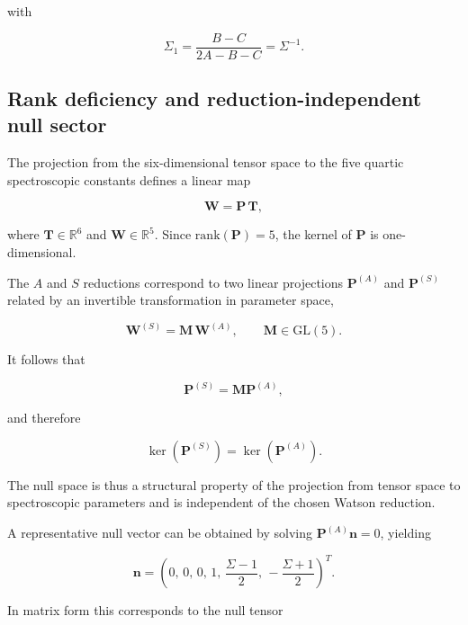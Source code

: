 \documentclass[aip,jcp,reprint,floatfix]{revtex4-2}
\begin{document}
with

\begin{equation}
\Sigma_1 = \frac{B-C}{2A-B-C} = \Sigma^{-1}.
\end{equation}

\subsection{Rank deficiency and reduction-independent null sector}

The projection from the six-dimensional tensor space to the five
quartic spectroscopic constants defines a linear map

\begin{equation}
\mathbf W = \mathbf P\, \mathbf T,
\end{equation}

where $\mathbf T \in \mathbb{R}^6$ and $\mathbf W \in \mathbb{R}^5$.
Since $\mathrm{rank}(\mathbf P)=5$, the kernel of $\mathbf P$ is
one-dimensional.

The $A$ and $S$ reductions correspond to two linear projections
$\mathbf P^{(A)}$ and $\mathbf P^{(S)}$ related by an invertible
transformation in parameter space,

\begin{equation}
\mathbf W^{(S)} = \mathbf M \, \mathbf W^{(A)},
\qquad
\mathbf M \in \mathrm{GL}(5).
\end{equation}

It follows that

\begin{equation}
\mathbf P^{(S)} = \mathbf M \mathbf P^{(A)},
\end{equation}

and therefore

\begin{equation}
\ker(\mathbf P^{(S)}) = \ker(\mathbf P^{(A)}).
\end{equation}

The null space is thus a structural property of the projection from
tensor space to spectroscopic parameters and is independent of the
chosen Watson reduction.

A representative null vector can be obtained by solving
$\mathbf P^{(A)} \mathbf n = 0$, yielding

\begin{equation}
\mathbf n =
\left(
0,\,
0,\,
0,\,
1,\,
\frac{\Sigma-1}{2},\,
-\frac{\Sigma+1}{2}
\right)^T .
\end{equation}

In matrix form this corresponds to the null tensor
\end{document}
